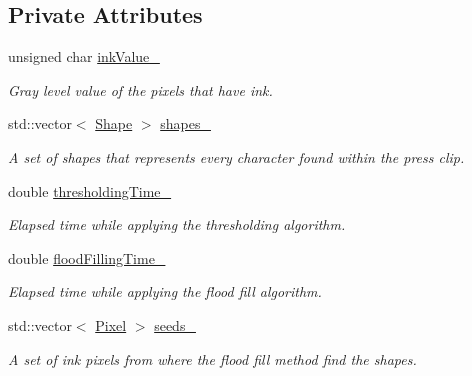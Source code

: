 \subsection*{Private Attributes}
\begin{CompactItemize}
\item 
\hypertarget{class_segmenter_fa6183f99aa6011399783652b341a43b}{
unsigned char \hyperlink{class_segmenter_fa6183f99aa6011399783652b341a43b}{inkValue\_\-}}
\label{class_segmenter_fa6183f99aa6011399783652b341a43b}

\begin{CompactList}\small\item\em Gray level value of the pixels that have ink. \item\end{CompactList}\item 
\hypertarget{class_segmenter_3040cc000907ef44e820ddcf70de6f08}{
std::vector$<$ \hyperlink{class_shape}{Shape} $>$ \hyperlink{class_segmenter_3040cc000907ef44e820ddcf70de6f08}{shapes\_\-}}
\label{class_segmenter_3040cc000907ef44e820ddcf70de6f08}

\begin{CompactList}\small\item\em A set of shapes that represents every character found within the press clip. \item\end{CompactList}\item 
\hypertarget{class_segmenter_13c768c0dfa734bb6ca0c548511bc7bb}{
double \hyperlink{class_segmenter_13c768c0dfa734bb6ca0c548511bc7bb}{thresholdingTime\_\-}}
\label{class_segmenter_13c768c0dfa734bb6ca0c548511bc7bb}

\begin{CompactList}\small\item\em Elapsed time while applying the thresholding algorithm. \item\end{CompactList}\item 
\hypertarget{class_segmenter_9f24d008767ba4741cf3d1e599ee119a}{
double \hyperlink{class_segmenter_9f24d008767ba4741cf3d1e599ee119a}{floodFillingTime\_\-}}
\label{class_segmenter_9f24d008767ba4741cf3d1e599ee119a}

\begin{CompactList}\small\item\em Elapsed time while applying the flood fill algorithm. \item\end{CompactList}\item 
\hypertarget{class_segmenter_32db9acb9fe721613eb98c7bb8d2a8f0}{
std::vector$<$ \hyperlink{_pixel_8hpp_535e59456e3e633842529cfa8ea103c4}{Pixel} $>$ \hyperlink{class_segmenter_32db9acb9fe721613eb98c7bb8d2a8f0}{seeds\_\-}}
\label{class_segmenter_32db9acb9fe721613eb98c7bb8d2a8f0}

\begin{CompactList}\small\item\em A set of ink pixels from where the flood fill method find the shapes. \item\end{CompactList}\end{CompactItemize}


